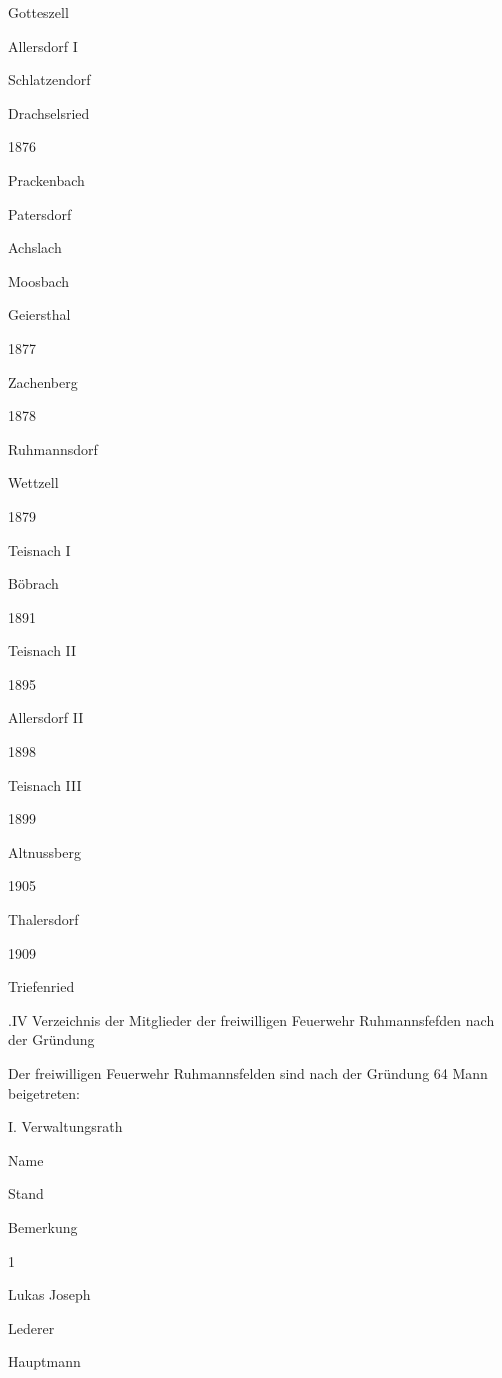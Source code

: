 \documentclass[12pt,a4pager]{book}
\begin{document}
Gotteszell



Allersdorf I



Schlatzendorf



Drachselsried

1876

Prackenbach



Patersdorf



Achslach



Moosbach



Geiersthal

1877

Zachenberg

1878

Ruhmannsdorf



Wettzell

1879

Teisnach I



Böbrach

1891

Teisnach II

1895

Allersdorf II

1898

Teisnach III

1899

Altnussberg

1905

Thalersdorf

1909

Triefenried

.IV Verzeichnis der Mitglieder der freiwilligen Feuerwehr Ruhmannsfefden nach
der Gründung

Der freiwilligen Feuerwehr Ruhmannsfelden sind nach der Gründung 64 Mann
beigetreten:



I. Verwaltungsrath



Name

Stand

Bemerkung

1

Lukas Joseph

Lederer

Hauptmann
\end{document}
